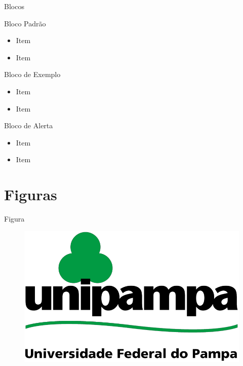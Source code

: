 \documentclass[aspectratio=1610]{beamer}
\begin{document}
	\begin{frame}{Blocos}
	
		\begin{block}{Bloco Padrão}
			\begin{itemize}
				\item Item
				\item Item
			\end{itemize}
		\end{block}

		\pause

		\begin{exampleblock}{Bloco de Exemplo}
			\begin{itemize}
				\item Item
				\item Item
			\end{itemize}
		\end{exampleblock}
	
		\pause

		\begin{alertblock}{Bloco de Alerta}
			\begin{itemize}
				\item Item
				\item Item
			\end{itemize}
		\end{alertblock}

	\end{frame}


	\section{Figuras}
	
	\begin{frame}{Figura}
		
		\begin{figure}[!htb]
			\centering
			\includegraphics[width=1\textwidth]{fig/unipampa.png}
		\end{figure}
	
	\end{frame}
\end{document}
